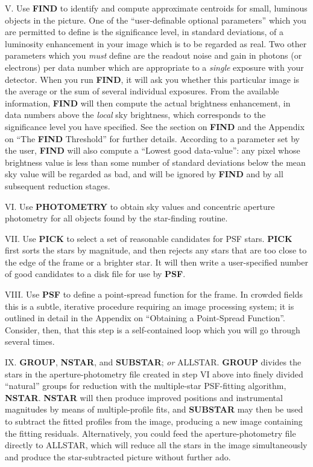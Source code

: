 \item{V.} Use {\bf FIND} to identify and compute approximate centroids
for small, luminous objects in the picture.  One of the
``user-definable optional parameters'' which you are permitted to
define is the significance level, in standard deviations, of a
luminosity enhancement in your image which is to be regarded as real.
Two other parameters which you {\it must\/} define are the readout
noise and gain in photons (or electrons) per data number which are
appropriate to a {\it single\/} exposure with your detector.  When you
run {\bf FIND}, it will ask you whether this particular image is the
average or the sum of several individual exposures.  From the available
information, {\bf FIND} will then compute the actual brightness
enhancement, in data numbers above the {\it local\/} sky brightness,
which corresponds to the significance level you have specified.  See
the section on {\bf FIND} and the Appendix on ``The {\bf FIND}
Threshold'' for further details.  According to a parameter set by the
user, {\bf FIND} will also compute a ``Lowest good data-value'':  any
pixel whose brightness value is less than some number of standard
deviations below the mean sky value will be regarded as bad, and will
be ignored by {\bf FIND} and by all subsequent reduction stages.

\item{VI.} Use {\bf PHOTOMETRY} to obtain sky values and concentric
aperture photometry for all objects found by the star-finding routine. 

\item{VII.} Use {\bf PICK} to select a set of reasonable candidates for
PSF stars.  {\bf PICK} first sorts the stars by magnitude, and then
rejects any stars that are too close to the edge of the frame or a
brighter star.  It will then write a user-specified number of good
candidates to a disk file for use by {\bf PSF}.

\item{VIII.} Use {\bf PSF} to define a point-spread function for the
frame.  In crowded fields this is a subtle, iterative procedure
requiring an image processing system; it is outlined in detail in the
Appendix on ``Obtaining a Point-Spread Function''.  Consider, then,
that this step is a self-contained loop which you will go through
several times.

\item{IX.}  {\bf GROUP}, {\bf NSTAR}, and {\bf SUBSTAR}; {\it or\/}
ALLSTAR.  {\bf GROUP} divides the stars in the
aperture-photometry file created in step VI above into finely divided
``natural'' groups for reduction with the multiple-star PSF-fitting
algorithm, \hbox{\bf NSTAR}. {\bf NSTAR} will then produce improved
positions and instrumental magnitudes by means of multiple-profile
fits, and {\bf SUBSTAR} may then be used to subtract the fitted
profiles from the image, producing a new image containing the fitting
residuals.  Alternatively, you could feed the aperture-photometry file
directly to ALLSTAR, which will reduce all the stars in the image
simultaneously and produce the star-subtracted picture without further
ado.

